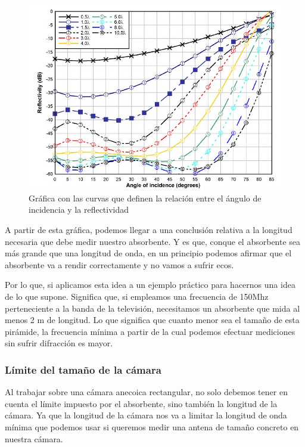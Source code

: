 \documentclass{article}
\begin{document}
\begin{figure}
    \centering
    \includegraphics[scale=0.65]{Tabla-limite-angulo-incidencia}
    \caption{Gráfica con las curvas que definen la relación entre el ángulo de incidencia y la reflectividad}
    \label{Tabla-limite-angulo-incidencia}
\end{figure}

A partir de esta gráfica, podemos llegar a una conclusión relativa a la longitud necesaria que debe medir nuestro absorbente. Y es que, conque el absorbente sea más grande que una longitud de onda, en un principio podemos afirmar que el absorbente va a rendir correctamente y no vamos a sufrir ecos.

\newpage

Por lo que, si aplicamos esta idea a un ejemplo práctico para hacernos una idea de lo que supone. Significa que, si empleamos una frecuencia de 150Mhz perteneciente a la banda de la televisión, necesitamos un absorbente que mida al menos 2 m de longitud. Lo que significa que cuanto menor sea el tamaño de esta pirámide, la frecuencia mínima a partir de la cual podemos efectuar mediciones sin sufrir difracción es mayor. 

\subsubsection{Límite del tamaño de la cámara}

Al trabajar sobre una cámara anecoica rectangular, no solo debemos tener en cuenta el límite impuesto por el absorbente, sino también la longitud de la cámara. Ya que la longitud de la cámara nos va a limitar la longitud de onda mínima que podemos usar si queremos medir una antena de tamaño concreto en nuestra cámara.\\ 
\end{document}
